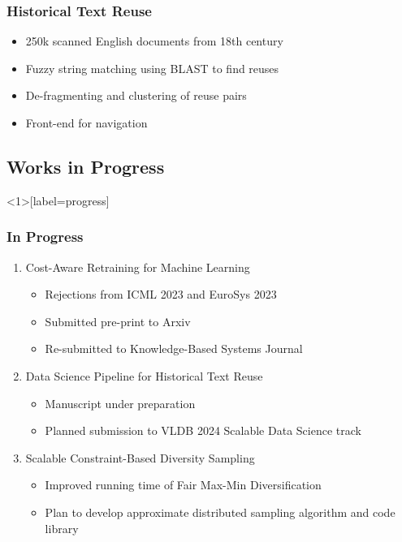 \documentclass[pdf]{beamer}
\begin{document}
\begin{frame}
    \frametitle{Historical Text Reuse}

    \begin{itemize}
        \item 250k scanned English documents from 18th century
        \item Fuzzy string matching using BLAST to find reuses
        \item De-fragmenting and clustering of reuse pairs
        \item Front-end for navigation
    \end{itemize}

\end{frame}


\subsection{Works in Progress}
\begin{frame}<1>[label=progress]
    \frametitle{In Progress}
    \begin{enumerate}[<+->]
        \item Cost-Aware Retraining for Machine Learning
        \begin{itemize}[<.->]
            \item Rejections from ICML 2023 and EuroSys 2023
            \item Submitted pre-print to Arxiv \cite{mahadevan2023costeffective}
            \item Re-submitted to Knowledge-Based Systems Journal
        \end{itemize}
        \item Data Science Pipeline for Historical Text Reuse
        \begin{itemize}[<.->]
            \item Manuscript under preparation
            \item Planned submission to VLDB 2024 Scalable Data Science track
        \end{itemize}
        \item Scalable Constraint-Based Diversity Sampling
        \begin{itemize}[<.->]
            \item Improved running time of Fair Max-Min Diversification \citep{wang2023fmmd}
            \item Plan to develop approximate distributed sampling algorithm and code library
        \end{itemize}
    \end{enumerate}

\end{frame}
\end{document}
